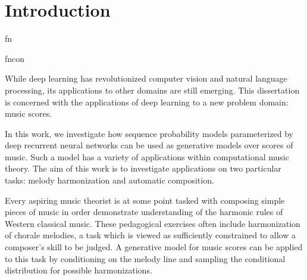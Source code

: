 \documentclass[a4paper,12pt,twoside,openright]{report}
\begin{document}
\pagestyle{empty}
\singlespacing

\onehalfspacing

\singlespacing


\setcounter{page}{0}
\pagestyle{plain}
\tableofcontents
\printglossary[title=Notation and Abbreviations]
\listoffigures
\listoftables

\onehalfspacing


\chapter{Introduction}
\setcounter{page}{1}




\gls{fn}

\gls{fncon}

While deep learning has revolutionized computer vision and natural language
processing, its applications to other domains are still emerging. This
dissertation is concerned with the applications of deep learning to a new
problem domain: music scores.

In this work, we investigate how sequence probability models parameterized by
deep recurrent neural networks can be used as generative models over scores of
music. Such a model has a variety of applications within computational music
theory. The aim of this work is to investigate applications on two particular
tasks: melody harmonization and automatic composition.

Every aspiring music theorist is at some point tasked with composing simple
pieces of music in order demonstrate understanding of the harmonic rules of
Western classical music. These pedagogical exercises often include
harmonization of chorale melodies, a task which is viewed as sufficiently
constrained to allow a composer's skill to be judged. A generative model
for music scores can be applied to this task by conditioning on the melody
line and sampling the conditional distribution for possible harmonizations.
\end{document}
